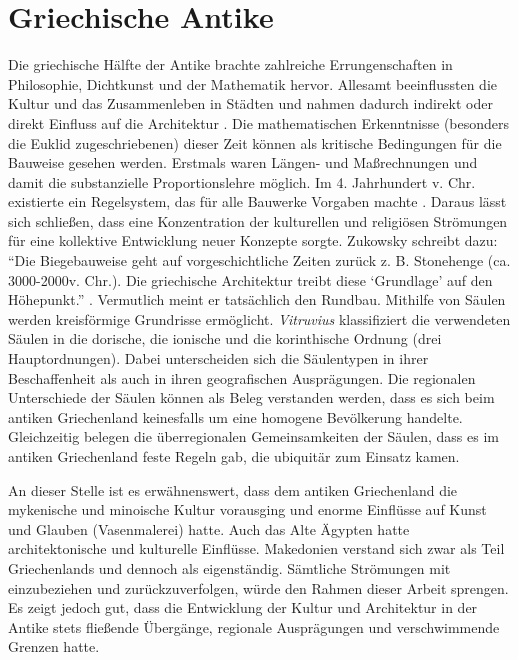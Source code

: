 \documentclass[
    a4paper,
    11pt,
    bibliography=totoc,
    listof=totoc,
    parskip=half,
    headings=normal
]{scrbook}
\begin{document}
\section{Griechische Antike}
Die griechische Hälfte der Antike brachte zahlreiche Errungenschaften in Philosophie, Dichtkunst und der Mathematik hervor. Allesamt beeinflussten die Kultur und das Zusammenleben in Städten und nahmen dadurch indirekt oder direkt Einfluss auf die Architektur \autocite[14]{hodgeKurzeGeschichteArchitektur2022}. Die mathematischen Erkenntnisse (besonders die Euklid zugeschriebenen) dieser Zeit können als kritische Bedingungen für die Bauweise gesehen werden. Erstmals waren Längen- und Maßrechnungen und damit die substanzielle Proportionslehre möglich. Im 4. Jahrhundert v. Chr. existierte ein Regelsystem, das für alle Bauwerke Vorgaben machte \autocite[22]{hodgeKurzeGeschichteArchitektur2022}. Daraus lässt sich schließen, dass eine Konzentration der kulturellen und religiösen Strömungen für eine kollektive Entwicklung neuer Konzepte sorgte. Zukowsky schreibt dazu: \enquote{Die Biegebauweise geht auf vorgeschichtliche Zeiten zurück z. B. Stonehenge (ca. 3000-2000v. Chr.). Die griechische Architektur treibt diese \enquote{Grundlage} auf den Höhepunkt.} \autocite[22]{zukowskyGeschichteArchitekturPyramide2022}. Vermutlich meint er tatsächlich den Rundbau. Mithilfe von Säulen werden kreisförmige Grundrisse ermöglicht. \textit{Vitruvius} klassifiziert die verwendeten Säulen in die dorische, die ionische und die korinthische Ordnung (drei Hauptordnungen). Dabei unterscheiden sich die Säulentypen in ihrer Beschaffenheit als auch in ihren geografischen Ausprägungen. Die regionalen Unterschiede der Säulen können als Beleg verstanden werden, dass es sich beim antiken Griechenland keinesfalls um eine homogene Bevölkerung handelte. Gleichzeitig belegen die überregionalen Gemeinsamkeiten der Säulen, dass es im antiken Griechenland feste Regeln gab, die ubiquitär zum Einsatz kamen.

An dieser Stelle ist es erwähnenswert, dass dem antiken Griechenland die mykenische und minoische Kultur vorausging und enorme Einflüsse auf Kunst und Glauben (Vasenmalerei) hatte. Auch das Alte Ägypten hatte architektonische und kulturelle Einflüsse. Makedonien verstand sich zwar als Teil Griechenlands und dennoch als eigenständig. Sämtliche Strömungen mit einzubeziehen und zurückzuverfolgen, würde den Rahmen dieser Arbeit sprengen. Es zeigt jedoch gut, dass die Entwicklung der Kultur und Architektur in der Antike stets fließende Übergänge, regionale Ausprägungen und verschwimmende Grenzen hatte.
\end{document}
